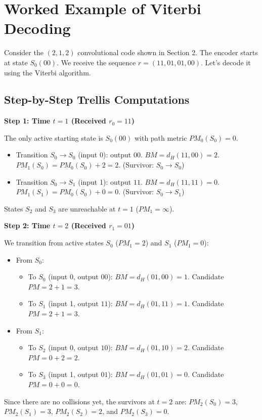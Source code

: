 \documentclass[12pt,a4paper]{article}
\begin{document}
\section{Worked Example of Viterbi Decoding}

Consider the $(2, 1, 2)$ convolutional code shown in Section 2. The encoder starts at state $S_0(00)$. We receive the sequence $r = (11, 01, 01, 00)$. Let's decode it using the Viterbi algorithm.

\subsection{Step-by-Step Trellis Computations}

\textbf{Step 1: Time $t=1$ (Received $r_0 = 11$)}\par\noindent
The only active starting state is $S_0(00)$ with path metric $PM_0(S_0) = 0$.
\begin{itemize}[leftmargin=*, itemsep=2.5pt]
  \item Transition $S_0 \to S_0$ (input 0): output $00$. $BM = d_H(11, 00) = 2$.
    $PM_1(S_0) = PM_0(S_0) + 2 = 2$. (Survivor: $S_0 \to S_0$)
  \item Transition $S_0 \to S_1$ (input 1): output $11$. $BM = d_H(11, 11) = 0$.
    $PM_1(S_1) = PM_0(S_0) + 0 = 0$. (Survivor: $S_0 \to S_1$)
\end{itemize}
States $S_2$ and $S_3$ are unreachable at $t=1$ ($PM_1 = \infty$).

\textbf{Step 2: Time $t=2$ (Received $r_1 = 01$)}\par\noindent
We transition from active states $S_0$ ($PM_1=2$) and $S_1$ ($PM_1=0$):
\begin{itemize}[leftmargin=*, itemsep=2.5pt]
  \item From $S_0$:
    \begin{itemize}[leftmargin=*, itemsep=1pt]
      \item To $S_0$ (input 0, output $00$): $BM = d_H(01, 00) = 1$. Candidate $PM = 2 + 1 = 3$.
      \item To $S_1$ (input 1, output $11$): $BM = d_H(01, 11) = 1$. Candidate $PM = 2 + 1 = 3$.
    \end{itemize}
  \item From $S_1$:
    \begin{itemize}[leftmargin=*, itemsep=1pt]
      \item To $S_2$ (input 0, output $10$): $BM = d_H(01, 10) = 2$. Candidate $PM = 0 + 2 = 2$.
      \item To $S_3$ (input 1, output $01$): $BM = d_H(01, 01) = 0$. Candidate $PM = 0 + 0 = 0$.
    \end{itemize}
\end{itemize}
Since there are no collisions yet, the survivors at $t=2$ are:
$PM_2(S_0) = 3$, $PM_2(S_1) = 3$, $PM_2(S_2) = 2$, and $PM_2(S_3) = 0$.
\end{document}
